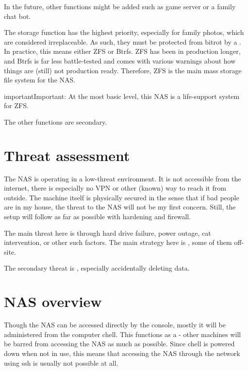 \documentclass[a4paper,10pt,english]{sphinxmanual}
\begin{document}
In the future, other functions might be added such as game server or a family
chat bot.

The storage function has the highest priority, especially for family photos,
which are considered irreplaceable. As such, they must be protected from bitrot
by a . In practice, this means either ZFS or Btrfs. ZFS
has been in production longer, and Btrfs is far less battle-tested and comes
with various warnings about how things are (still) not production ready.
Therefore, ZFS is the main mass storage file system for the NAS.

\begin{sphinxadmonition}{important}{Important:}
At the most basic level, this NAS is a life-support system for
ZFS.
\end{sphinxadmonition}

The other functions are secondary.


\section{Threat assessment}
\label{\detokenize{goals:threat-assessment}}
The NAS is operating in a low-threat environment. It is not accessible from the
internet, there is especially no VPN or other (known) way to reach it from
outside. The machine itself is physically secured in the sense that if bad
people are in my house, the threat to the NAS will not be my first concern.
Still, the setup will follow  as far as possible with hardening
and firewall.

The main threat here is  through hard drive failure, power outage,
cat intervention, or other such factors. The main strategy here is , some of them off-site.

The secondary threat is , especially accidentally deleting
data.


\section{NAS overview}
\label{\detokenize{goals:nas-overview}}
Though the NAS can be accessed directly by the console, mostly it will be
administered from the computer chell. This functions as a  - other
machines will be barred from accessing the NAS as much as possible. Since chell
is powered down when not in use, this means that accessing the NAS through the
network using ssh is usually not possible at all.
\end{document}
